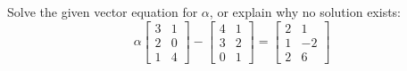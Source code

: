 Solve the given vector equation for $\alpha$, or explain why no solution exists:
%
\begin{equation*}
\alpha \begin{bmatrix} 3 & 1 \\ 2 & 0 \\ 1 & 4\end{bmatrix} -
\begin{bmatrix} 4 & 1 \\ 3 & 2 \\ 0 & 1 \end{bmatrix} 
=
\begin{bmatrix} 2 & 1 \\ 1 & -2 \\ 2 & 6 \end{bmatrix}
\end{equation*}
%